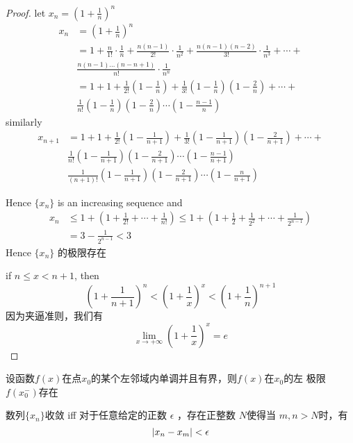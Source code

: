 \documentclass[11pt]{article}
\begin{document}
\begin{proof}
let \(x_n=(1+\frac{1}{n})^n\)
\begin{align*}
x_n&=(1+\frac{1}{n})^n\\
&=1+\frac{n}{1!}\cdot\frac{1}{n}+\frac{n(n-1)}{2!}\cdot\frac{1}{n^2}+
\frac{n(n-1)(n-2)}{3!}\cdot\frac{1}{n^3}+\cdots+\\
&\frac{n(n-1)\dots(n-n+1)}{n!}\cdot\frac{1}{n^n}\\
&=1+1+\frac{1}{2!}(1-\frac{1}{n})+\frac{1}{3!}(1-\frac{1}{n})(1-\frac{2}{n})+\cdots+\\
&\frac{1}{n!}(1-\frac{1}{n})(1-\frac{2}{n})\cdots(1-\frac{n-1}{n})
\end{align*}
similarly
\begin{align*}
x_{n+1}&=1+1+\frac{1}{2!}(1-\frac{1}{n+1})+\frac{1}{3!}(1-\frac{1}{n+1})(1-\frac{2}{n+1})+\cdots+\\
&\frac{1}{n!}(1-\frac{1}{n+1})(1-\frac{2}{n+1})\cdots(1-\frac{n-1}{n+1})\\
&\frac{1}{(n+1)!}(1-\frac{1}{n+1})(1-\frac{2}{n+1})\cdots(1-\frac{n}{n+1})
\end{align*}

Hence \(\{x_n\}\) is an increasing sequence and
\begin{align*}
x_n&\le 1+(1+\frac{1}{2!}+\cdots+\frac{1}{n!})\le 1+(1+\frac{1}{2}+\frac{1}{2^2}+\cdots+\frac{1}{2^{n-1}})\\
&=3-\frac{1}{2^{n-1}}<3
\end{align*}
Hence \(\{x_n\}\) 的极限存在

if \(n\le x<n+1\), then
\begin{equation*}
(1+\frac{1}{n+1})^n<(1+\frac{1}{x})^x<(1+\frac{1}{n})^{n+1}
\end{equation*}
因为夹逼准则，我们有
\begin{equation*}
\lim_{x\to+\infty}(1+\frac{1}{x})^x=e
\end{equation*}
\end{proof}

\begin{proposition}[准则 2']
设函数\(f(x)\)在点\(x_0\)的某个左邻域内单调并且有界，则\(f(x)\)在\(x_0\)的左
极限\(f(x_0^-)\)存在
\end{proposition}

\begin{proposition}[柯西极限存在准则]
数列\(\{x_n\}\)收敛 iff 对于任意给定的正数 \(\epsilon\) ，存在正整数 \(N\)使得当
\(m,n>N\)时，有
\begin{equation*}
\abs{x_n-x_m}<\epsilon
\end{equation*}
\end{proposition}
\end{document}
